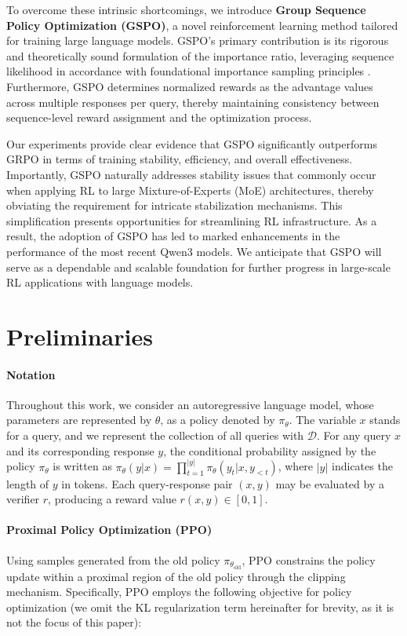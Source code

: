To overcome these intrinsic shortcomings, we introduce \textbf{Group Sequence Policy Optimization (GSPO)}, a novel reinforcement learning method tailored for training large language models. GSPO's primary contribution is its rigorous and theoretically sound formulation of the importance ratio, leveraging sequence likelihood in accordance with foundational importance sampling principles \citep{click}. Furthermore, GSPO determines normalized rewards as the advantage values across multiple responses per query, thereby maintaining consistency between sequence-level reward assignment and the optimization process.

Our experiments provide clear evidence that GSPO significantly outperforms GRPO in terms of training stability, efficiency, and overall effectiveness. Importantly, GSPO naturally addresses stability issues that commonly occur when applying RL to large Mixture-of-Experts (MoE) architectures, thereby obviating the requirement for intricate stabilization mechanisms. This simplification presents opportunities for streamlining RL infrastructure. As a result, the adoption of GSPO has led to marked enhancements in the performance of the most recent Qwen3 models. We anticipate that GSPO will serve as a dependable and scalable foundation for further progress in large-scale RL applications with language models.

\section{Preliminaries}

\paragraph{Notation}  
Throughout this work, we consider an autoregressive language model, whose parameters are represented by $\theta$, as a policy denoted by $\pi_\theta$. The variable $x$ stands for a query, and we represent the collection of all queries with $\mathcal{D}$. For any query $x$ and its corresponding response $y$, the conditional probability assigned by the policy $\pi_\theta$ is written as $\pi_\theta (y | x)=\prod_{t=1}^{|y|} \pi_\theta (y_t | x, y_{<t} )$, where $|y|$ indicates the length of $y$ in tokens. Each query-response pair $(x, y)$ may be evaluated by a verifier $r$, producing a reward value $r(x, y) \in [0, 1]$.

\paragraph{Proximal Policy Optimization (PPO)} Using samples generated from the old policy $\pi_{\theta_\text{old}}$, PPO \citep{ppo} constrains the policy update within a proximal region of the old policy through the clipping mechanism. Specifically, PPO employs the following objective for policy optimization (we omit the KL regularization term hereinafter for brevity, as it is not the focus of this paper):

